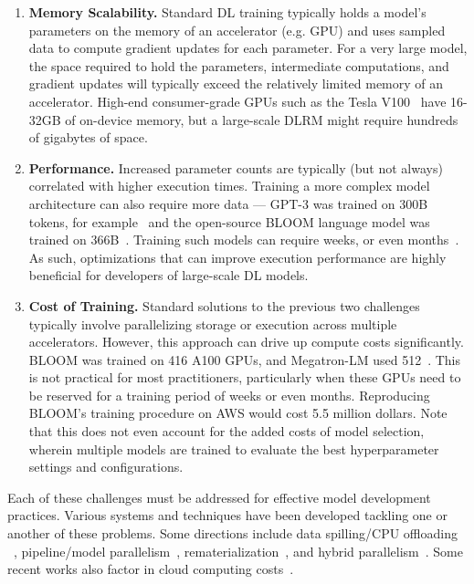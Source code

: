 \begin{enumerate}
\item \textbf{Memory Scalability.} Standard DL training typically holds a model's parameters on the memory of an accelerator (e.g. GPU) and uses sampled data to compute gradient updates for each parameter. For a very large model, the space required to hold the parameters, intermediate computations, and gradient updates will typically exceed the relatively limited memory of an accelerator. High-end consumer-grade GPUs such as the Tesla V100~\cite{teslav100} have 16-32GB of on-device memory, but a large-scale DLRM might require hundreds of gigabytes of space.
\item \textbf{Performance.} Increased parameter counts are typically (but not always) correlated with higher execution times. Training a more complex model architecture can also require more data --- GPT-3 was trained on 300B tokens, for example~\cite{gpt2020} and the open-source BLOOM language model was trained on 366B~\cite{bloom2022}. Training such models can require weeks, or even months~\cite{dlrm2019,bloom2022}. As such, optimizations that can improve execution performance are highly beneficial
for developers of large-scale DL models.
\item \textbf{Cost of Training.} Standard solutions to the previous two challenges typically involve parallelizing storage or execution across multiple accelerators. However, this approach can drive up compute costs significantly. BLOOM was trained on 416 A100 GPUs, and Megatron-LM used 512~\cite{megatronlmblog2020}. This is not practical for most practitioners, particularly when these GPUs need to be reserved for a training period of weeks or even months. Reproducing BLOOM's training procedure on AWS
would cost 5.5 million dollars. Note that this does not even account for the added costs of model selection, wherein multiple models are trained to evaluate the best hyperparameter settings and configurations.
\end{enumerate}

Each of these challenges must be addressed for effective model development practices. Various systems and techniques have been developed tackling one or another of these problems. Some directions include data spilling/CPU offloading
~\cite{zero2019, zero2021,hydra2021,mpms2021,swapadvisor2021,l2l2020}, pipeline/model parallelism~\cite{gpipe2018,pipedream2018,terapipe2021,torchgpipe2020,megatronlmgpuscaling2021}, rematerialization~\cite{checkpointing2016}, and hybrid parallelism~\cite{flexflow2018,alpa2022,hydra2021,mpms2021,gshard2020}. Some recent works also factor in cloud computing costs~\cite{srifty2022,hydrozoa2022}.

